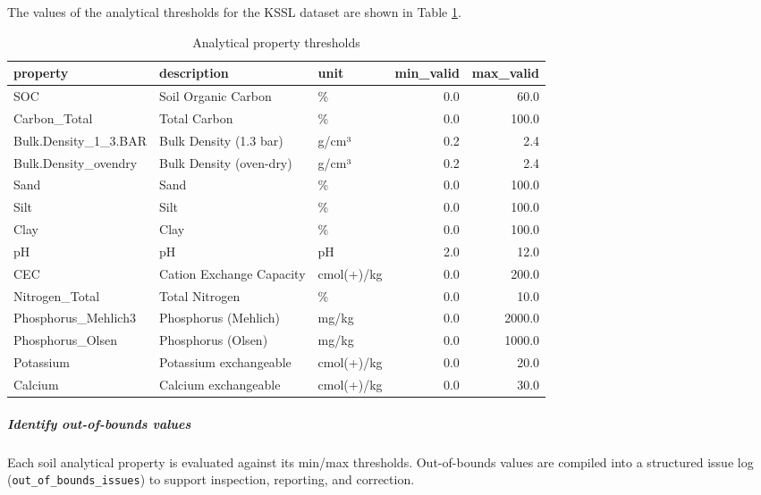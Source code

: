\documentclass[
  10pt,
  b5paper,
  oneside]{book}
\begin{document}
The values of the analytical thresholds for the KSSL dataset are shown in Table \ref{tab:thresholds-print}.

\begin{table}

\caption{\label{tab:thresholds-print}Analytical property thresholds}
\centering
\begin{tabular}[t]{l|l|l|r|r}
\hline
property & description & unit & min\_valid & max\_valid\\
\hline
SOC & Soil Organic Carbon & \% & 0.0 & 60.0\\
\hline
Carbon\_Total & Total Carbon & \% & 0.0 & 100.0\\
\hline
Bulk.Density\_1\_3.BAR & Bulk Density (1.3 bar) & g/cm³ & 0.2 & 2.4\\
\hline
Bulk.Density\_ovendry & Bulk Density (oven-dry) & g/cm³ & 0.2 & 2.4\\
\hline
Sand & Sand & \% & 0.0 & 100.0\\
\hline
Silt & Silt & \% & 0.0 & 100.0\\
\hline
Clay & Clay & \% & 0.0 & 100.0\\
\hline
pH & pH & pH & 2.0 & 12.0\\
\hline
CEC & Cation Exchange Capacity & cmol(+)/kg & 0.0 & 200.0\\
\hline
Nitrogen\_Total & Total Nitrogen & \% & 0.0 & 10.0\\
\hline
Phosphorus\_Mehlich3 & Phosphorus (Mehlich) & mg/kg & 0.0 & 2000.0\\
\hline
Phosphorus\_Olsen & Phosphorus (Olsen) & mg/kg & 0.0 & 1000.0\\
\hline
Potassium & Potassium exchangeable & cmol(+)/kg & 0.0 & 20.0\\
\hline
Calcium & Calcium exchangeable & cmol(+)/kg & 0.0 & 30.0\\
\hline
\end{tabular}
\end{table}

\subparagraph*{Identify out-of-bounds values}\label{identify-out-of-bounds-values}

Each soil analytical property is evaluated against its min/max thresholds. Out-of-bounds values are compiled into a structured issue log (\texttt{out\_of\_bounds\_issues}) to support inspection, reporting, and correction.
\end{document}
